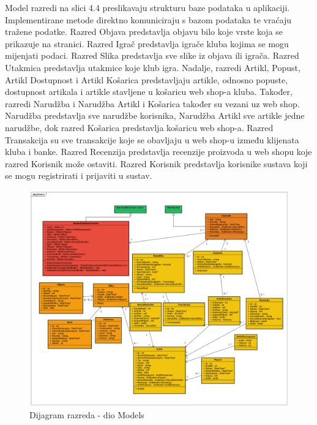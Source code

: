 			\textnormal{Model razredi na slici 4.4 preslikavaju strukturu baze podataka u aplikaciji. Implementirane metode direktno komuniciraju s bazom podataka te vraćaju tražene podatke. Razred Objava predstavlja objavu bilo koje vrste koja se prikazuje na stranici. Razred Igrač predstavlja igrače kluba kojima se mogu mijenjati podaci. Razred Slika predstavlja sve slike iz objava ili igrača. Razred Utakmica predstavlja utakmice koje klub igra. Nadalje, razredi Artikl, Popust, Artikl Dostupnost i Artikl Košarica predstavljaju artikle, odnosno popuste, dostupnost artikala i artikle stavljene u košaricu web shop-a kluba. Također, razredi Narudžba i Narudžba Artikl i Košarica također su vezani uz web shop. Narudžba predstavlja sve narudžbe korisnika, Narudžba Artikl sve artikle jedne narudžbe, dok razred Košarica predstavlja košaricu web shop-a. Razred Transakcija su sve transakcije koje se obavljaju u web shop-u između klijenata kluba i banke. Razred Recenzija predstavlja recenzije proizvoda u web shopu koje razred Korisnik može ostaviti. Razred Korisnik predstavlja korisnike sustava koji se mogu registrirati i prijaviti u sustav.}\\
		
		\begin{figure}[H]
			\includegraphics[width=\linewidth]{dijagrami/DijagramRazredaModels.png}
			\centering
			\caption{Dijagram razreda - dio Models}
			\label{fig:ClassDiagram1}
		\end{figure}
			
			
